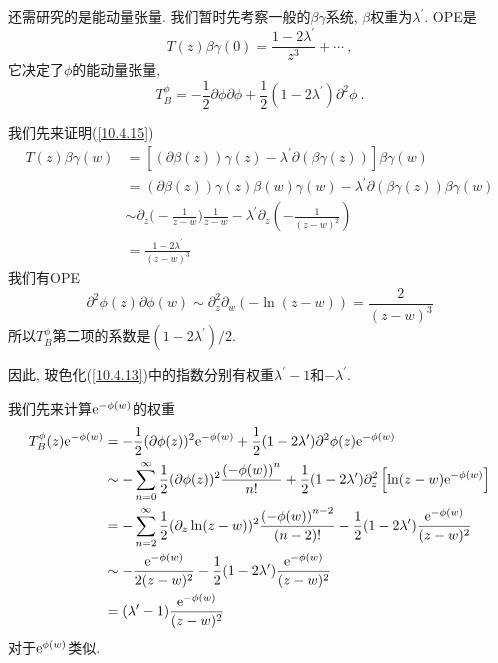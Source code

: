 还需研究的是能动量张量. 我们暂时先考察一般的$ \beta\gamma $系统, $\beta $权重为$ \lambda^{\prime}$. OPE是
\begin{equation}
    T(z)\beta\gamma(0) = \frac{1-2\lambda^{\prime}}{z^{3}}+\cdots \:, \label{10.4.15}
\end{equation}
它决定了$ \phi $的能动量张量,
\begin{equation}
    T_{B}^{\phi}=-\frac{1}{2}\partial\phi \partial\phi +\frac{1}{2}(1-2\lambda^{\prime})\partial^{2}\phi\:. \label{10.4.16}
\end{equation}
\begin{tcolorbox}[breakable]
我们先来证明(\ref{10.4.15})
\begin{align*}
T(z)\beta \gamma (w) &=[(\partial \beta (z))\gamma (z)-\lambda ^{\prime
}\partial (\beta \gamma (z))]\beta \gamma (w) \\
&=(\partial \beta (z))\gamma (z)\beta (w)\gamma (w)-\lambda ^{\prime
}\partial (\beta \gamma (z))\beta \gamma (w) \\
&\sim \partial _{z}\biggl(-\frac{1}{z-w}\biggr)\frac{1}{z-w}-\lambda ^{\prime }\partial
_{z}\left( -\frac{1}{(z-w)^{2}}\right)  \\
&=\frac{1-2\lambda ^{\prime }}{(z-w)^{3}}
\end{align*}%
我们有OPE%
\[
\partial ^{2}\phi (z)\partial \phi (w)\sim \partial _{z}^{2}\partial
_{w}(-\ln (z-w))=\frac{2}{(z-w)^{3}}
\]%
所以$ T_{B}^{\phi} $第二项的系数是$(1-2\lambda ^{\prime })/2$.
\end{tcolorbox}
\noindent 因此, 玻色化(\ref{10.4.13})中的指数分别有权重$ \lambda^{\prime}-1 $和$ -\lambda^{\prime}$.
\begin{tcolorbox}
我们先来计算$ \mathrm{e}^{-\phi(w)} $的权重
\begin{align*}
T_{B}^{\phi }(z)\me^{-\phi (w)} &=-\frac{1}{2}(\partial \phi (z))^{2}\me^{-\phi
(w)}+\frac{1}{2}(1-2\lambda ^{\prime })\partial ^{2}\phi (z)\me^{-\phi (w)} \\
&\sim -\sum_{n=0}^{\infty }\frac{1}{2}(\partial \phi (z))^{2}\frac{\left(
-\phi (w)\right) ^{n}}{n!}+\frac{1}{2}(1-2\lambda ^{\prime })\partial
_{z}^{2}\left[ \ln (z-w)\me^{-\phi (w)}\right]  \\
&=-\sum_{n=2}^{\infty }\frac{1}{2}(\partial _{z}\ln (z-w))^{2}\frac{\left(
-\phi (w)\right) ^{n-2}}{(n-2)!}-\frac{1}{2}(1-2\lambda ^{\prime })\frac{%
\me^{-\phi (w)}}{(z-w)^{2}} \\
&\sim -\frac{\me^{-\phi (w)}}{2(z-w)^{2}}-\frac{1}{2}(1-2\lambda ^{\prime })%
\frac{\me^{-\phi (w)}}{(z-w)^{2}} \\
&=(\lambda ^{\prime }-1)\frac{\me^{-\phi (w)}}{(z-w)^{2}}
\end{align*}
对于$ \mathrm{e}^{\phi(w)} $类似.
\end{tcolorbox}
